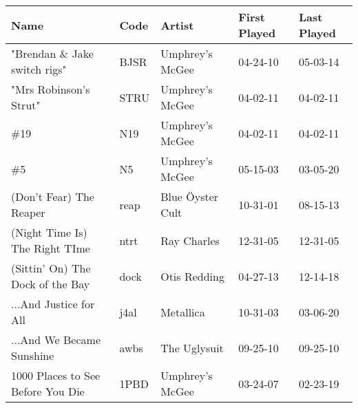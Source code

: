 \begin{longtable}{p{}p{}p{}p{}p{}}
                                                           \textbf{Name} & \textbf{Code} &                                          \textbf{Artist} & \textbf{First Played} & \textbf{Last Played} \\
\midrule
\endhead 
                                           "Brendan \& Jake switch rigs" &          BJSR &                                          Umphrey's McGee &              04-24-10 &             05-03-14 \\
                                                  "Mrs Robinson's Strut" &          STRU &                                          Umphrey's McGee &              04-02-11 &             04-02-11 \\
                                                                    \#19 &           N19 &                                          Umphrey's McGee &              04-02-11 &             04-02-11 \\
                                                                     \#5 &            N5 &                                          Umphrey's McGee &              05-15-03 &             03-05-20 \\
                                                 (Don't Fear) The Reaper &          reap &                                         Blue Öyster Cult &              10-31-01 &             08-15-13 \\
                                          (Night Time Is) The Right TIme &          ntrt &                                              Ray Charles &              12-31-05 &             12-31-05 \\
                                        (Sittin' On) The Dock of the Bay &          dock &                                             Otis Redding &              04-27-13 &             12-14-18 \\
                                                  ...And Justice for All &          j4al &                                                Metallica &              10-31-03 &             03-06-20 \\
                                               ...And We Became Sunshine &          awbs &                                             The Uglysuit &              09-25-10 &             09-25-10 \\
                                       1000 Places to See Before You Die &          1PBD &                                          Umphrey's McGee &              03-24-07 &             02-23-19 \\

\end{longtable}
